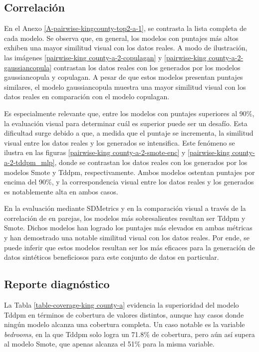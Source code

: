 \newpage

\subsection{Correlación}
\label{correlacion-kingcounty}
En el Anexo \ref{A-pairwise-kingcounty-top2-a-1}, se contrasta la lista completa de cada modelo. Se observa que, en general, los modelos con puntajes más altos exhiben una mayor similitud visual con los datos reales. A modo de ilustración, las imágenes \ref{pairwise-king county-a-2-copulagan} y \ref{pairwise-king county-a-2-gaussiancopula} contrastan los datos reales con los generados por los modelos gaussiancopula y copulagan. A pesar de que estos modelos presentan puntajes similares, el modelo gaussiancopula muestra una mayor similitud visual con los datos reales en comparación con el modelo copulagan.



\newpage
Es especialmente relevante que, entre los modelos con puntajes superiores al 90\%, la evaluación visual para determinar cuál es superior puede ser un desafío. Esta dificultad surge debido a que, a medida que el puntaje se incrementa, la similitud visual entre los datos reales y los generados se intensifica. Este fenómeno se ilustra en las figuras \ref{pairwise-king county-a-2-smote-enc} y \ref{pairwise-king county-a-2-tddpm_mlp}, donde se contrastan los datos reales con los generados por los modelos Smote y Tddpm, respectivamente. Ambos modelos ostentan puntajes por encima del 90\%, y la correspondencia visual entre los datos reales y los generados es notablemente alta en ambos casos.




\newpage
En la evaluación mediante SDMetrics y en la comparación visual a través de la correlación de en parejas, los modelos más sobresalientes resultan ser Tddpm y Smote. Dichos modelos han logrado los puntajes más elevados en ambas métricas y han demostrado una notable similitud visual con los datos reales. Por ende, se puede inferir que estos modelos resultan ser los más eficaces para la generación de datos sintéticos beneficiosos para este conjunto de datos en particular.

\subsection{Reporte diagnóstico}
\label{diagnostico-kingcounty}
La Tabla \ref{table-coverage-king county-a} evidencia la superioridad del modelo Tddpm en términos de cobertura de valores distintos, aunque hay casos donde ningún modelo alcanza una cobertura completa. Un caso notable es la variable \emph{bedrooms}, en la que Tddpm solo logra un 71.8\% de cobertura, pero aún así supera al modelo Smote, que apenas alcanza el 51\% para la misma variable.

